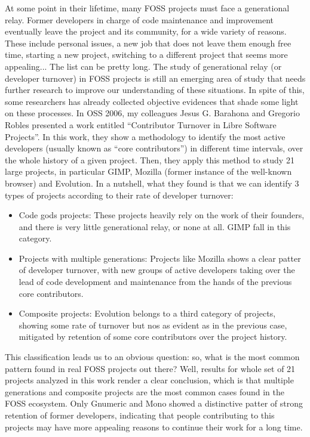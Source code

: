 At some point in their lifetime, many FOSS projects must face a generational relay. Former developers in charge of code maintenance and improvement eventually leave the project and its community, for a wide variety of reasons. These include personal issues, a new job that does not leave them enough free time, starting a new project, switching to a different project that seems more appealing... The list can be pretty long.
The study of generational relay (or developer turnover) in FOSS projects is still an emerging area of study that needs further research to improve our understanding of these situations. In spite of this, some researchers has already collected objective evidences that shade some light on these processes. In OSS 2006, my colleagues Jesus G. Barahona and Gregorio Robles presented a work entitled “Contributor Turnover in Libre Software Projects”. In this work, they show a methodology to identify the most active developers (usually known as “core contributors”) in different time intervals, over the whole history of a given  project. Then, they apply this method to study 21 large projects, in particular GIMP, Mozilla (former instance of the well-known browser) and Evolution. In a nutshell, what they found is that we can identify 3 types of projects according to their rate of developer turnover:
\begin{itemize}
 \item Code gods projects: These projects heavily rely on the work of their founders, and there is very little generational relay, or none at all. GIMP fall in this category.
 \item Projects with multiple generations: Projects like Mozilla shows a clear patter of developer turnover, with new groups of active developers taking over the lead of code development and maintenance from the hands of the previous core contributors.
 \item Composite projects: Evolution belongs to a third category of projects, showing some rate of turnover but nos as evident as in the previous case, mitigated by retention of some core contributors over the project history.
\end{itemize}

This classification leads us to an obvious question: so, what is the most common pattern found in real FOSS projects out there? Well, results for whole set of 21 projects analyzed in this work render a clear conclusion, which is that multiple generations and composite projects are the most common cases found in the FOSS ecosystem. Only Gnumeric and Mono showed a distinctive patter of strong retention of former developers, indicating that people contributing to this projects may have more appealing reasons to continue their work for a long time.

